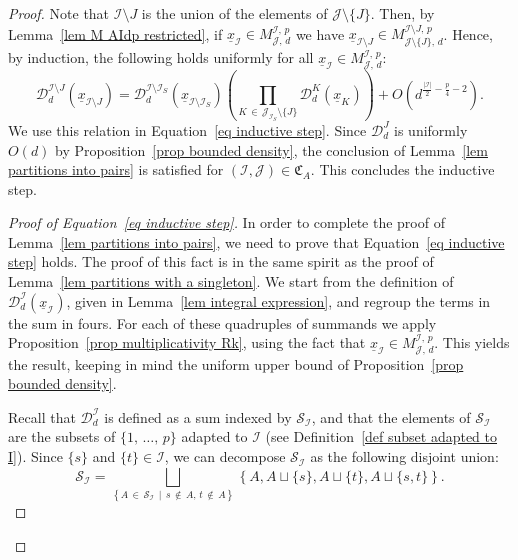 \documentclass[10pt]{amsart}
\theoremstyle{definition}\newtheorem{defi}[theo]{Definition}\newtheorem{rema}[theo]{Remark}\newtheorem{exam}[theo]{Example}\newtheorem{exem}[theo]{Example}\newtheorem{nota}[theo]{Notation}
\newcommand{\D}{\mathcal{D}}
\newcommand{\I}{\mathcal{I}}
\newcommand{\J}{\mathcal{J}}
\newcommand{\clS}{\mathcal{S}}
\newcommand{\frkC}{\mathfrak{C}}
\newcommand{\norm}[1]{\left\lvert #1 \right\rvert}
\begin{document}
\begin{proof}
\pagebreak
Note that $\I \setminus J$ is the union of the elements of $\J \setminus \{J\}$. Then, by Lemma~\ref{lem M AIdp restricted}, if $\underline{x}_\I \in M^{\I,\,p}_{\J,\,d}$ we have $\underline{x}_{\I \setminus J} \in M^{\I \setminus J,\,p}_{\J \setminus \{J\},\,d}$. Hence, by induction, the following holds uniformly for all $\underline{x}_\I \in M^{\I,\,p}_{\J,\,d}$:
\[
\D_d^{\I \setminus J}\left(\underline{x}_{\I \setminus J}\right) = \D_d^{\I \setminus \I_S}\left(\underline{x}_{\I \setminus \I_S}\right) \left(\prod_{K\,\in\,\J_{\I_S} \setminus \{J\}}\D_d^K\left(\underline{x}_K\right)\right) +O\left(d^{\frac{\norm{\I}}{2}-\frac{p}{4}-2}\right).
\]
We use this relation in Equation~\eqref{eq inductive step}. Since $\D_d^J$ is uniformly $O(d)$ by Proposition~\ref{prop bounded density}, the conclusion of Lemma~\ref{lem partitions into pairs} is satisfied for $(\I,\J) \in \frkC_A$. This concludes the inductive step.

\begin{proof}[{Proof of Equation~\eqref{eq inductive step}}]
In order to complete the proof of Lemma~\ref{lem partitions into pairs}, we need to prove that Equation~\eqref{eq inductive step} holds. The proof of this fact is in the same spirit as the proof of Lemma~\ref{lem partitions with a singleton}. We start from the definition of $\D_d^\I(\underline{x}_\I)$, given in Lemma~\ref{lem integral expression}, and regroup the terms in the sum in fours. For each of these quadruples of summands we apply Proposition~\ref{prop multiplicativity Rk}, using the fact that $\underline{x}_\I \in M^{\I,\,p}_{\J,\,d}$. This yields the result, keeping in mind the uniform upper bound of Proposition~\ref{prop bounded density}.

Recall that $\D_d^\I$ is defined as a sum indexed by $\clS_\I$, and that the elements of $\clS_\I$ are the subsets of $\{1,\,\dots,\,p\}$ adapted to $\I$ (see Definition~\ref{def subset adapted to I}). Since $\{s\}$ and $\{t\} \in \I$, we can decompose $\clS_\I$ as the following disjoint union:
\[
\clS_\I = \bigsqcup_{\left\{A\,\in\,\clS_\I\,\mid\,s\,\notin\,A,\,t \,\notin\,A\right\} } \left\{A, A \sqcup \{s\}, A \sqcup \{t\}, A \sqcup \{s,t\}\right\}.
\]


\end{proof}
\end{proof}
\end{document}
